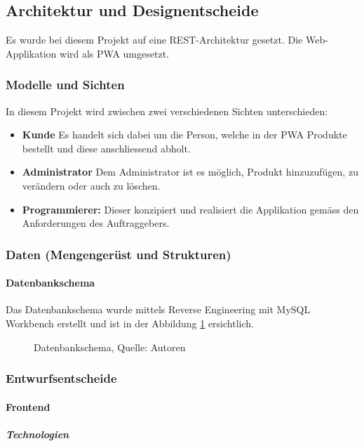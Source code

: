 \newpage
\subsection{Architektur und Designentscheide}
Es wurde bei diesem Projekt auf eine REST-Architektur gesetzt. Die Web-Applikation wird als \ac{PWA} umgesetzt. 
\subsubsection{Modelle und Sichten}
In diesem Projekt wird zwischen zwei verschiedenen Sichten unterschieden:
\begin{itemize}
    \item \textbf{Kunde} Es handelt sich dabei um die Person, welche in der \ac{PWA} Produkte bestellt und diese anschliessend abholt. 
    \item \textbf{Administrator} Dem Administrator ist es möglich, Produkt hinzuzufügen, zu verändern oder auch zu löschen. 
    \item \textbf{Programmierer: } Dieser konzipiert und realisiert die Applikation gemäss den Anforderungen des Auftraggebers.
\end{itemize}
\subsubsection{Daten (Mengengerüst und Strukturen)}
\paragraph{Datenbankschema}
Das Datenbankschema wurde mittels Reverse Engineering mit MySQL Workbench erstellt und ist in der Abbildung \ref{img: datebankschema} ersichtlich.
\begin{figure}[H]
    \centering
    \caption[Datenbankschema]{Datenbankschema, Quelle: Autoren}
    \label{img: datebankschema}
\end{figure}
\subsubsection{Entwurfsentscheide}
\paragraph{Frontend}
\subparagraph{Technologien}

